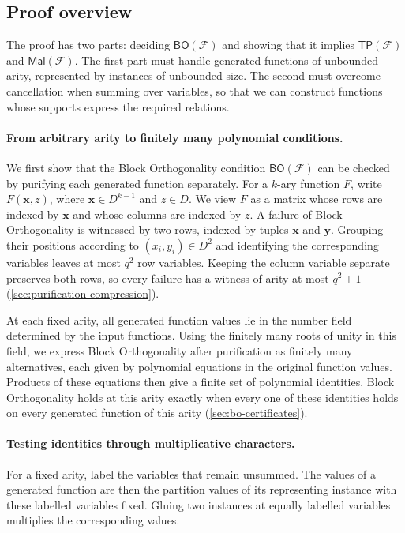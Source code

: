 \documentclass[11pt,letterpaper,onecolumn]{article}
\theoremstyle{plain}
\theoremstyle{definition}
\theoremstyle{remark}
\newcommand{\cF}{\mathcal F}
\newcommand{\BO}{\mathsf{BO}}
\newcommand{\TP}{\mathsf{TP}}
\newcommand{\Mal}{\mathsf{Mal}}
\begin{document}
\subsection{Proof overview}
\label{subsec:proof-sketch}

The proof has two parts: deciding $\BO(\cF)$ and showing that it implies
$\TP(\cF)$ and $\Mal(\cF)$.  The first part must handle generated functions
of unbounded arity, represented by instances of unbounded size.  The second
must overcome cancellation when summing over variables, so that we can
construct functions whose supports express the required relations.

\paragraph{From arbitrary arity to finitely many polynomial conditions.}
We first show that the Block Orthogonality condition $\BO(\cF)$ can be
checked by purifying each generated function separately.  For a $k$-ary
function $F$, write $F(\mathbf x,z)$, where $\mathbf x\in D^{k-1}$ and
$z\in D$.  We view $F$ as a matrix whose rows are indexed by $\mathbf x$
and whose columns are indexed by $z$.  A failure of Block Orthogonality is
witnessed by two rows, indexed by tuples $\mathbf x$ and $\mathbf y$.
Grouping their positions according to $(x_i,y_i)\in D^2$ and identifying
the corresponding variables leaves at most $q^2$ row variables.  Keeping
the column variable separate preserves both rows, so every failure has a
witness of arity at most $q^2+1$ (\cref{sec:purification-compression}).

At each fixed arity, all generated function values lie in the number field
determined by the input functions.  Using the finitely many roots of unity
in this field, we express Block Orthogonality after purification as finitely
many alternatives, each given by polynomial equations in the original
function values.  Products of these equations then give a finite set of
polynomial identities.  Block Orthogonality holds at this arity exactly
when every one of these identities holds on every generated function of
this arity (\cref{sec:bo-certificates}).

\paragraph{Testing identities through multiplicative characters.}
For a fixed arity, label the variables that remain unsummed.  The values of
a generated function are then the partition values of its representing
instance with these labelled variables fixed.  Gluing two instances at
equally labelled variables multiplies the corresponding values.
\end{document}
